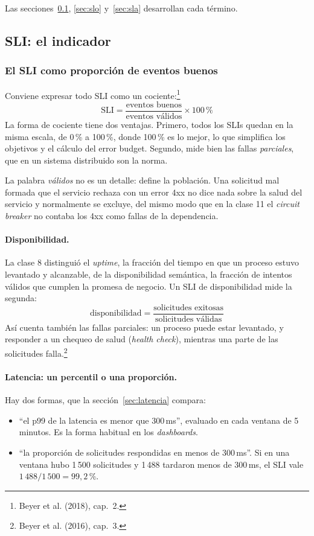 \documentclass[variant=apuntes,cover=institutional,mode=screen]{ua-engineering-v6-article}
\begin{document}
Las secciones~\ref{sec:sli}, \ref{sec:slo} y~\ref{sec:sla} desarrollan cada término.

\subsection{SLI: el indicador}\label{sec:sli}

\subsubsection{El SLI como proporción de eventos buenos}

Conviene expresar todo SLI como un cociente:\footnote{Beyer et al. (2018), cap.~2.}
\[
\text{SLI} = \frac{\text{eventos buenos}}{\text{eventos válidos}} \times 100\,\%
\]
La forma de cociente tiene dos ventajas. Primero, todos los SLIs quedan en la misma escala, de 0\,\% a 100\,\%, donde 100\,\% es lo mejor, lo que simplifica los objetivos y el cálculo del error budget. Segundo, mide bien las fallas \emph{parciales}, que en un sistema distribuido son la norma.

La palabra \emph{válidos} no es un detalle: define la población. Una solicitud mal formada que el servicio rechaza con un error 4xx no dice nada sobre la salud del servicio y normalmente se excluye, del mismo modo que en la clase 11 el \emph{circuit breaker} no contaba los 4xx como fallas de la dependencia.

\paragraph{Disponibilidad.} La clase 8 distinguió el \emph{uptime}, la fracción del tiempo en que un proceso estuvo levantado y alcanzable, de la disponibilidad semántica, la fracción de intentos válidos que cumplen la promesa de negocio. Un SLI de disponibilidad mide la segunda:
\[
\text{disponibilidad} = \frac{\text{solicitudes exitosas}}{\text{solicitudes válidas}}
\]
Así cuenta también las fallas parciales: un proceso puede estar levantado, y responder a un chequeo de salud (\emph{health check}), mientras una parte de las solicitudes falla.\footnote{Beyer et al. (2016), cap.~3.}

\paragraph{Latencia: un percentil o una proporción.} Hay dos formas, que la sección~\ref{sec:latencia} compara:
\begin{itemize}
\item ``el p99 de la latencia es menor que 300\,ms'', evaluado en cada ventana de 5 minutos. Es la forma habitual en los \emph{dashboards}.
\item ``la proporción de solicitudes respondidas en menos de 300\,ms''. Si en una ventana hubo 1\,500 solicitudes y 1\,488 tardaron menos de 300\,ms, el SLI vale $1\,488/1\,500 = 99{,}2\,\%$.
\end{itemize}
\end{document}
